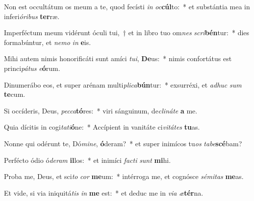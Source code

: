 \item Non est occultátum os meum a te, quod fecísti \textit{in} \textit{oc}\textbf{cúl}to:~* et substántia mea in inferi\textit{ó}\textit{ri}\textit{bus} \textbf{ter}ræ.
\item Imperféctum meum vidérunt óculi tui,~† et in libro tuo om\textit{nes} \textit{scri}\textbf{bén}tur:~* dies formabúntur, et \textit{ne}\textit{mo} \textit{in} \textbf{e}is.
\item Mihi autem nimis honorificáti sunt amíci \textit{tu}\textit{i}, \textbf{De}us:~* nimis confortátus est princi\textit{pá}\textit{tus} \textit{e}\textbf{ó}rum.
\item Dinumerábo eos, et super arénam multi\textit{pli}\textit{ca}\textbf{bún}tur:~* exsurréxi, et \textit{ad}\textit{huc} \textit{sum} \textbf{te}cum.
\item Si occíderis, Deus, \textit{pec}\textit{ca}\textbf{tó}res:~* viri sánguinum, de\textit{cli}\textit{ná}\textit{te} \textbf{a} me.
\item Quia dícitis in cogi\textit{ta}\textit{ti}\textbf{ó}ne:~* Accípient in vanitáte ci\textit{vi}\textit{tá}\textit{tes} \textbf{tu}as.
\item Nonne qui odérunt te, Dó\textit{mi}\textit{ne}, \textbf{ó}deram?~* et super inimícos tu\textit{os} \textit{ta}\textit{be}\textbf{scé}bam?
\item Perfécto ódio ó\textit{de}\textit{ram} \textbf{il}los:~* et inimíci \textit{fac}\textit{ti} \textit{sunt} \textbf{mi}hi.
\item Proba me, Deus, et sci\textit{to} \textit{cor} \textbf{me}um:~* intérroga me, et cognósce \textit{sé}\textit{mi}\textit{tas} \textbf{me}as.
\item Et vide, si via iniquitá\textit{tis} \textit{in} \textbf{me} est:~* et deduc me in \textit{vi}\textit{a} \textit{æ}\textbf{tér}na.
